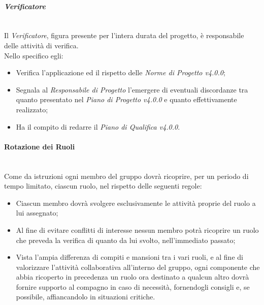 \paragraph{\textit{Verificatore}} ~\\
	Il \textit{Verificatore}, figura presente per l'intera durata del progetto, è responsabile delle attività di 				verifica.\\
	Nello specifico egli:
	\begin{itemize}
	\item Verifica l'applicazione ed il rispetto delle \textit{Norme di Progetto v4.0.0};
	\item Segnala al \textit{Responsabile di Progetto} l'emergere di eventuali discordanze tra quanto presentato nel 			\textit{Piano di Progetto v4.0.0} e quanto effettivamente realizzato;
	\item Ha il compito di redarre il \textit{Piano di Qualifica v4.0.0}.
	\end{itemize}

\paragraph{Rotazione dei Ruoli} ~\\
	Come da istruzioni ogni membro del gruppo dovrà ricoprire, per un periodo di tempo limitato, ciascun ruolo, nel 			rispetto delle seguenti regole:
	\begin{itemize}
	\item Ciascun membro dovrà svolgere esclusivamente le attività proprie del ruolo a lui assegnato;
	\item Al fine di evitare conflitti di interesse nessun membro potrà ricoprire un ruolo che preveda la 									verifica di quanto da lui svolto, nell'immediato passato;
	\item Vista l'ampia differenza di compiti e mansioni tra i vari ruoli, e al fine di valorizzare l'attività 						collaborativa all'interno del gruppo, ogni componente che abbia ricoperto in precedenza un ruolo ora destinato 			a qualcun altro dovrà fornire supporto al compagno in caso di necessità, fornendogli consigli e, se possibile, 			affiancandolo in situazioni critiche.
	\end{itemize}

